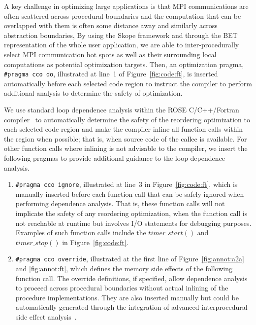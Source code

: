 A key challenge in optimizing large applications is that MPI
communications are often scattered across procedural boundaries and
the computation that can be overlapped with them is often some
distance away and similarly across abstraction boundaries, By using
the Skope framework and through the BET representation of the whole
user application, we are able to inter-procedurally select MPI
communication hot spots as well as their surrounding local
computations as potential optimization targets.
Then, an optimization pragma,  \texttt{\#pragma cco do}, 
illustrated at line~1 of Figure~\ref{fig:code:ft}, is inserted automatically before each selected code region
to instruct the compiler to perform additional analysis to determine the safety of optimization.

We use standard loop dependence analysis within the ROSE C/C++/Fortran compiler~\cite {ROSE} to automatically 
determine the safety of the reordering optimization to each selected code
region and make the compiler inline all function calls within the region when possible; 
that is, when source code of the callee is available. 
For other function calls where inlining is not advisable to the compiler, we insert the following pragmas to provide
additional guidance to the loop dependence analysis. 

\begin{enumerate}

\item \texttt{\#pragma cco ignore}, illustrated at line~3 in
  Figure~\ref{fig:code:ft}, which is manually inserted before each
  function call that can be safely ignored when performing dependence
  analysis. That is, these function calls will not implicate the
  safety of any reordering optimization, when the function call is not
  reachable at runtime but involves I/O statements for debugging
  purposes. Examples of such function calls include the
  $timer\_start()$ and $timer\_stop()$ in Figure~\ref{fig:code:ft}.

\item \texttt{\#pragma cco override}, illustrated at the first line of
  Figure~\ref{fig:annot:a2a} and \ref{fig:annot:ft}, which defines the
  memory side effects of the following function call.  The override
  definitions, if specified, allow dependence analysis to proceed
  across procedural boundaries without actual inlining of the
  procedure implementations. They are also inserted manually but could
  be automatically generated through the integration of advanced
  interprocedural side effect analysis~\cite{kennedy:cpld88}.

\end{enumerate}

